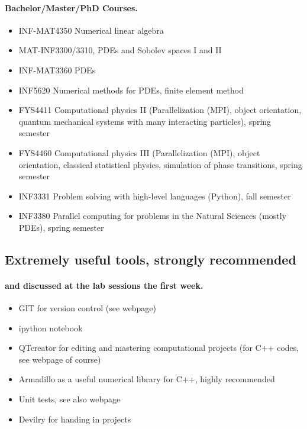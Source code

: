 \documentclass[%
oneside,                 %
final,                   %
10pt]{article}
\begin{document}
\paragraph{Bachelor/Master/PhD Courses.}
\begin{itemize}
  \item INF-MAT4350 Numerical linear algebra

  \item MAT-INF3300/3310, PDEs and Sobolev spaces I and II

  \item INF-MAT3360 PDEs

  \item INF5620 Numerical methods for PDEs, finite element method

  \item FYS4411 Computational physics II (Parallelization (MPI), object orientation, quantum mechanical systems with many interacting particles), spring semester

  \item FYS4460 Computational physics III (Parallelization (MPI), object orientation, classical statistical physics, simulation of phase transitions, spring semester

  \item INF3331 Problem solving with high-level languages (Python), fall semester

  \item INF3380 Parallel computing for problems in the Natural Sciences (mostly PDEs), spring semester
\end{itemize}

\noindent




\subsection*{Extremely useful tools, strongly recommended}


\paragraph{and discussed at the lab sessions the first week.}
\begin{itemize}
  \item GIT for version control (see webpage)

  \item ipython notebook

  \item QTcreator for editing and mastering computational projects (for C++ codes, see webpage of course)

  \item Armadillo as a useful numerical library for C++, highly recommended

  \item Unit tests, see also webpage

  \item Devilry for handing in projects
\end{itemize}
\end{document}
